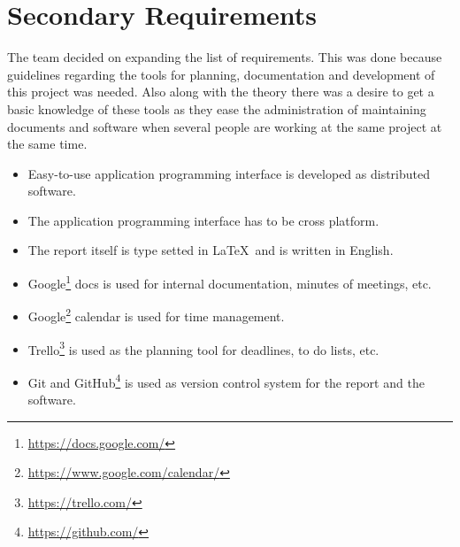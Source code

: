 \section{Secondary Requirements}
The team decided on expanding the list of requirements. This was done because guidelines regarding the tools for planning, documentation and development of this project was needed. 
Also along with the theory there was a desire to get a basic knowledge of these tools as they ease the administration of maintaining documents and software when several people are working at the same project at the same time.

\begin{itemize}
\item Easy-to-use application programming interface is developed as distributed software.
\item The application programming interface has to be cross platform.
\item The report itself is type setted in \LaTeX\ and is written in English.
\item Google\footnote{\url{https://docs.google.com/}} docs is used for internal documentation, minutes of meetings, etc.
\item Google\footnote{\url{https://www.google.com/calendar/}} calendar is used for time management.
\item Trello\footnote{\url{https://trello.com/}} is used as the planning tool for deadlines, to do lists, etc.
\item Git and GitHub\footnote{\url{https://github.com/}} is used as version control system for the report and the software.
\end{itemize}

